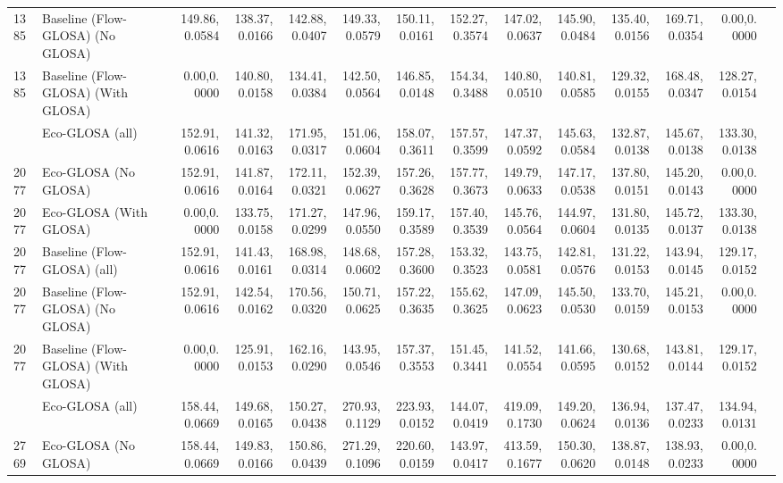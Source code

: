 \begin{table}[ht]
{\begin{tabular}{llrrrrrrrrrrrr}
        1385 & Baseline (Flow-GLOSA) (No GLOSA)   & 149.86,0.0584 & 138.37,0.0166 & 142.88,0.0407 & 149.33,0.0579 & 150.11,0.0161 & 152.27,0.3574 & 147.02,0.0637 & 145.90,0.0484 & 135.40,0.0156 & 169.71,0.0354 & 0.00,0.0000   \\
        1385 & Baseline (Flow-GLOSA) (With GLOSA) & 0.00,0.0000   & 140.80,0.0158 & 134.41,0.0384 & 142.50,0.0564 & 146.85,0.0148 & 154.34,0.3488 & 140.80,0.0510 & 140.81,0.0585 & 129.32,0.0155 & 168.48,0.0347 & 128.27,0.0154 \\
        \addlinespace
        2077 & Eco-GLOSA (all)                    & 152.91,0.0616 & 141.32,0.0163 & 171.95,0.0317 & 151.06,0.0604 & 158.07,0.3611 & 157.57,0.3599 & 147.37,0.0592 & 145.63,0.0584 & 132.87,0.0138 & 145.67,0.0138 & 133.30,0.0138 \\
        2077 & Eco-GLOSA (No GLOSA)               & 152.91,0.0616 & 141.87,0.0164 & 172.11,0.0321 & 152.39,0.0627 & 157.26,0.3628 & 157.77,0.3673 & 149.79,0.0633 & 147.17,0.0538 & 137.80,0.0151 & 145.20,0.0143 & 0.00,0.0000   \\
        2077 & Eco-GLOSA (With GLOSA)             & 0.00,0.0000   & 133.75,0.0158 & 171.27,0.0299 & 147.96,0.0550 & 159.17,0.3589 & 157.40,0.3539 & 145.76,0.0564 & 144.97,0.0604 & 131.80,0.0135 & 145.72,0.0137 & 133.30,0.0138 \\
        2077 & Baseline (Flow-GLOSA) (all)        & 152.91,0.0616 & 141.43,0.0161 & 168.98,0.0314 & 148.68,0.0602 & 157.28,0.3600 & 153.32,0.3523 & 143.75,0.0581 & 142.81,0.0576 & 131.22,0.0153 & 143.94,0.0145 & 129.17,0.0152 \\
        2077 & Baseline (Flow-GLOSA) (No GLOSA)   & 152.91,0.0616 & 142.54,0.0162 & 170.56,0.0320 & 150.71,0.0625 & 157.22,0.3635 & 155.62,0.3625 & 147.09,0.0623 & 145.50,0.0530 & 133.70,0.0159 & 145.21,0.0153 & 0.00,0.0000   \\
        2077 & Baseline (Flow-GLOSA) (With GLOSA) & 0.00,0.0000   & 125.91,0.0153 & 162.16,0.0290 & 143.95,0.0546 & 157.37,0.3553 & 151.45,0.3441 & 141.52,0.0554 & 141.66,0.0595 & 130.68,0.0152 & 143.81,0.0144 & 129.17,0.0152 \\
        \addlinespace
        2769 & Eco-GLOSA (all)                    & 158.44,0.0669 & 149.68,0.0165 & 150.27,0.0438 & 270.93,0.1129 & 223.93,0.0152 & 144.07,0.0419 & 419.09,0.1730 & 149.20,0.0624 & 136.94,0.0136 & 137.47,0.0233 & 134.94,0.0131 \\
        2769 & Eco-GLOSA (No GLOSA)               & 158.44,0.0669 & 149.83,0.0166 & 150.86,0.0439 & 271.29,0.1096 & 220.60,0.0159 & 143.97,0.0417 & 413.59,0.1677 & 150.30,0.0620 & 138.87,0.0148 & 138.93,0.0233 & 0.00,0.0000   \\

\end{tabular}}
\end{table}
